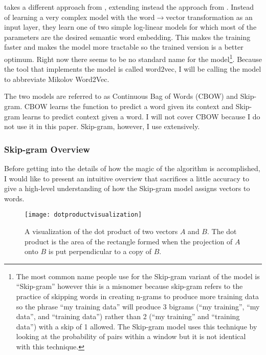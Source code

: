 \citep{Mikolov2013b} takes a different approach from \citep{Bengio2003},
extending instead the approach from \citep{Mikolov2007}. 
Instead of learning a very 
complex model with the word$\rightarrow$vector transformation as an input layer, they
learn one of two simple log-linear models for which most of the parameters
are the desired semantic word embedding. This makes the training faster and
makes the model more tractable so the trained version is a better optimum.
Right now there seems to be no standard name for the model\footnote{The most 
common name people use for the
Skip-gram variant of the model is ``Skip-gram'' however this is a misnomer 
because skip-gram refers to the practice of skipping words in creating n-grams
to produce more training data \citep[see][]{Guthrie2006} so the phrase 
``my training data'' will produce 3 bigrams (``my training'', ``my data'', 
and ``training data'') rather than 2 (``my training'' and ``training data'')
with a skip of 1 allowed. The Skip-gram model uses this technique by looking
at the probability of pairs within a window but it is not identical with this
technique.
}. Because the tool that implements the model is called word2vec, I will be 
calling the model \modelname{} to abbreviate 
Mikolov Word2Vec.

The two models are referred to as Continuous Bag of Words (CBOW) and 
Skip-gram. CBOW learns the function to predict a word given its context and
Skip-gram learns to predict context given a word. I will not cover CBOW because
I do not use it in this paper. Skip-gram, however, I use extensively. 

\subsubsection{Skip-gram Overview}

Before getting into the details of how the magic of the algorithm is 
accomplished, I would like to present an intuitive overview that sacrifices 
a little accuracy to give a high-level understanding of how the Skip-gram model
assigns vectors to words.

\begin{figure}[tbp]
  \texttt{[image: dotproductvisualization]}
  \caption{A visualization of the dot product of two vectors $A$ and $B$. The 
  dot product is the area of the rectangle formed when the projection of $A$
  onto $B$ is put perpendicular to a copy of $B$.}
  \label{fig:dotproductvisualization}
\end{figure}

